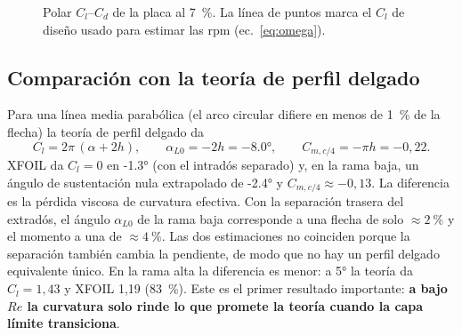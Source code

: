 \begin{figure}[H]
\centering
{}
\caption{Polar $C_l$--$C_d$ de la placa al \SI{7}{\percent}. La línea de puntos marca el
$C_l$ de diseño usado para estimar las rpm (ec.~\ref{eq:omega}).}
\label{fig:polares-placa7-polar}
\end{figure}

\subsection{Comparación con la teoría de perfil delgado}
Para una línea media parabólica (el arco circular difiere en menos de
\SI{1}{\percent} de la flecha) la teoría de perfil delgado da~\cite{anderson2017}
\begin{equation}
  C_l=2\pi\,(\alpha+2h),\qquad \alpha_{L0}=-2h=\ang{-8.0},\qquad
  C_{m,c/4}=-\pi h=-0{,}22 .
  \label{eq:polares-tpd}
\end{equation}
XFOIL da $C_l=0$ en \ang{-1.3} (con el intradós separado) y, en la rama baja, un
ángulo de sustentación nula extrapolado de \ang{-2.4} y $C_{m,c/4}\approx-0{,}13$. La
diferencia es la pérdida viscosa de curvatura efectiva. Con la separación trasera del
extradós, el ángulo $\alpha_{L0}$ de la rama baja corresponde a una flecha de solo
$\approx\SI{2}{\percent}$ y el momento a una de $\approx\SI{4}{\percent}$. Las dos
estimaciones no coinciden porque la separación también cambia la pendiente, de modo que
no hay un perfil delgado equivalente único. En la rama alta la diferencia es menor: a
\ang{5} la teoría da $C_l=1{,}43$ y XFOIL 1,19 (\SI{83}{\percent}).
Este es el primer resultado importante: \textbf{a bajo $Re$ la curvatura solo rinde lo
que promete la teoría cuando la capa límite transiciona}.

